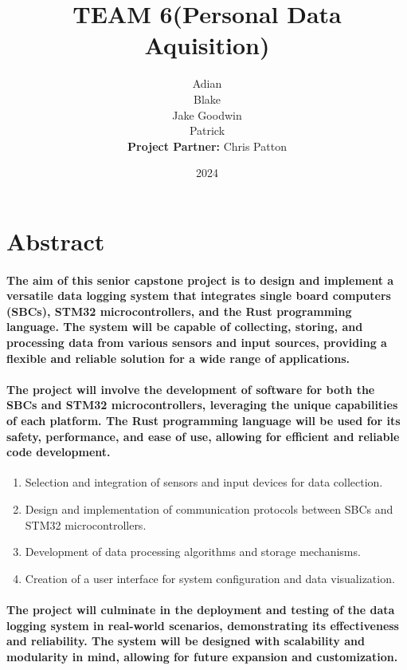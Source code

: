 \documentclass{article}
\title{TEAM 6(Personal Data Aquisition)}
\author{
Adian\\
Blake\\
Jake Goodwin\\
Patrick\\
\textbf{Project Partner:} Chris Patton
}
\date{2024}
\begin{document}
\maketitle
\newpage


\tableofcontents

\newpage

\section{Abstract}
\paragraph{
The aim of this senior capstone project is to design and implement a versatile
data logging system that integrates single board computers (SBCs), STM32
microcontrollers, and the Rust programming language. The system will be capable
of collecting, storing, and processing data from various sensors and input
sources, providing a flexible and reliable solution for a wide range of
applications.
}

\paragraph{
The project will involve the development of software for both the SBCs and
STM32 microcontrollers, leveraging the unique capabilities of each platform.
The Rust programming language will be used for its safety, performance, and
ease of use, allowing for efficient and reliable code development.
}

\begin{enumerate}
    \item Selection and integration of sensors and input devices for data 
        collection.
    \item Design and implementation of communication protocols between SBCs 
        and STM32 microcontrollers. 
    \item Development of data processing algorithms and storage mechanisms.
    \item Creation of a user interface for system configuration and data 
        visualization.
\end{enumerate}

\paragraph{
The project will culminate in the deployment and testing of the data logging
system in real-world scenarios, demonstrating its effectiveness and
reliability. The system will be designed with scalability and modularity in
mind, allowing for future expansion and customization.
}
\end{document}

